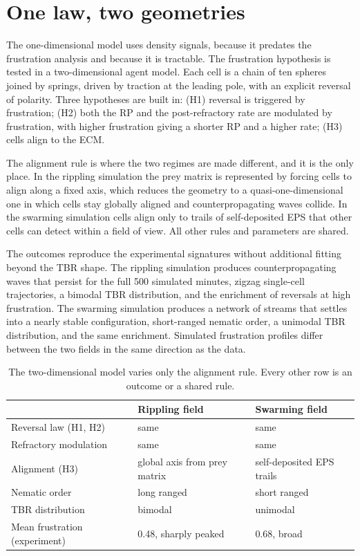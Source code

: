 \documentclass[11pt]{article}
\theoremstyle{definition}
\theoremstyle{remark}
\begin{document}
\section{One law, two geometries}

The one-dimensional model uses density signals, because it predates the frustration analysis and because it is tractable. The frustration hypothesis is tested in a two-dimensional agent model. Each cell is a chain of ten spheres joined by springs, driven by traction at the leading pole, with an explicit reversal of polarity. Three hypotheses are built in: (H1) reversal is triggered by frustration; (H2) both the RP and the post-refractory rate are modulated by frustration, with higher frustration giving a shorter RP and a higher rate; (H3) cells align to the ECM.

The alignment rule is where the two regimes are made different, and it is the only place. In the rippling simulation the prey matrix is represented by forcing cells to align along a fixed axis, which reduces the geometry to a quasi-one-dimensional one in which cells stay globally aligned and counterpropagating waves collide. In the swarming simulation cells align only to trails of self-deposited EPS that other cells can detect within a field of view. All other rules and parameters are shared.

The outcomes reproduce the experimental signatures without additional fitting beyond the TBR shape. The rippling simulation produces counterpropagating waves that persist for the full 500 simulated minutes, zigzag single-cell trajectories, a bimodal TBR distribution, and the enrichment of reversals at high frustration. The swarming simulation produces a network of streams that settles into a nearly stable configuration, short-ranged nematic order, a unimodal TBR distribution, and the same enrichment. Simulated frustration profiles differ between the two fields in the same direction as the data.

\begin{table}[h]
\centering
\small
\begin{tabular}{@{}lll@{}}
\toprule
 & Rippling field & Swarming field \\
\midrule
Reversal law (H1, H2) & same & same \\
Refractory modulation & same & same \\
Alignment (H3) & global axis from prey matrix & self-deposited EPS trails \\
Nematic order & long ranged & short ranged \\
TBR distribution & bimodal & unimodal \\
Mean frustration (experiment) & 0.48, sharply peaked & 0.68, broad \\
\bottomrule
\end{tabular}
\caption{The two-dimensional model varies only the alignment rule. Every other row is an outcome or a shared rule.}
\end{table}
\end{document}
